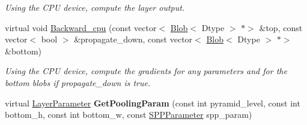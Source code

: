 \begin{DoxyCompactItemize}
\begin{DoxyCompactList}\small\item\em Using the C\+PU device, compute the layer output. \end{DoxyCompactList}\item 
\mbox{\label{classcaffe_1_1_s_p_p_layer_af214d75db799a1a209be3a726585b54a}} 
virtual void \mbox{\hyperlink{classcaffe_1_1_s_p_p_layer_af214d75db799a1a209be3a726585b54a}{Backward\+\_\+cpu}} (const vector$<$ \mbox{\hyperlink{classcaffe_1_1_blob}{Blob}}$<$ Dtype $>$ $\ast$$>$ \&top, const vector$<$ bool $>$ \&propagate\+\_\+down, const vector$<$ \mbox{\hyperlink{classcaffe_1_1_blob}{Blob}}$<$ Dtype $>$ $\ast$$>$ \&bottom)
\begin{DoxyCompactList}\small\item\em Using the C\+PU device, compute the gradients for any parameters and for the bottom blobs if propagate\+\_\+down is true. \end{DoxyCompactList}\item 
\mbox{\label{classcaffe_1_1_s_p_p_layer_a5b8a1deaef832fdb9be7747938a63896}} 
virtual \mbox{\hyperlink{classcaffe_1_1_layer_parameter}{Layer\+Parameter}} {\bfseries Get\+Pooling\+Param} (const int pyramid\+\_\+level, const int bottom\+\_\+h, const int bottom\+\_\+w, const \mbox{\hyperlink{classcaffe_1_1_s_p_p_parameter}{S\+P\+P\+Parameter}} spp\+\_\+param)
\end{DoxyCompactItemize}

